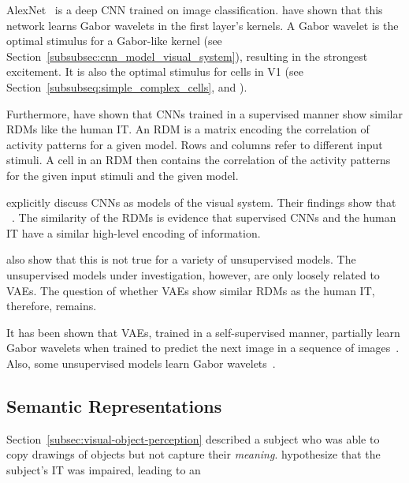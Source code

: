 AlexNet~\citep{krizhevsky2012imagenet} is a deep \ac{CNN} trained on image classification.
\citet{krizhevsky2012imagenet} have shown that this network learns Gabor wavelets in the first layer’s kernels.
A Gabor wavelet is the optimal stimulus for a Gabor-like kernel (see Section~\ref{subsubsec:cnn_model_visual_system}), resulting in the strongest excitement.
It is also the optimal stimulus for cells in \ac{V1} (see Section~\ref{subsubseq:simple_complex_cells}, and \citet{jones1987evaluation}).

Furthermore, \citet{khaligh2014deep} have shown that \acp{CNN} trained in a supervised manner show similar \acp{RDM} like the human \ac{IT}.
An \ac{RDM} is a matrix encoding the correlation of activity patterns for a given model.
Rows and columns refer to different input stimuli.
A cell in an \ac{RDM} then contains the correlation of the activity patterns for the given input stimuli and the given model.

\citet{eickenberg2017seeing} explicitly discuss \acp{CNN} as models of the visual system.
Their findings show that ~\citep{eickenberg2017seeing, wen2018neural}.
The similarity of the \acp{RDM} is evidence that supervised \acp{CNN} and the human \ac{IT} have a similar high-level encoding of information.

\citet{khaligh2014deep} also show that this is not true for a variety of unsupervised models.
The unsupervised models under investigation, however, are only loosely related to \acfp{VAE}.
The question of whether \acp{VAE} show similar \acp{RDM} as the human \ac{IT}, therefore, remains.

It has been shown that \acp{VAE}, trained in a self-supervised manner, partially learn Gabor wavelets when trained to predict the next image in a sequence of images~\citep{palm2012prediction}.
Also, some unsupervised models learn Gabor wavelets~\citep{berkes2005slow}.

\subsection{Semantic Representations}\label{subsec:semantic-representations}

Section~\ref{subsec:visual-object-perception} described a subject who was able to copy drawings of objects but not capture their \textit{meaning}.
\citet[pp. 1069, 1070]{squire2012fundamental} hypothesize that the subject's \ac{IT} was impaired, leading to an 

